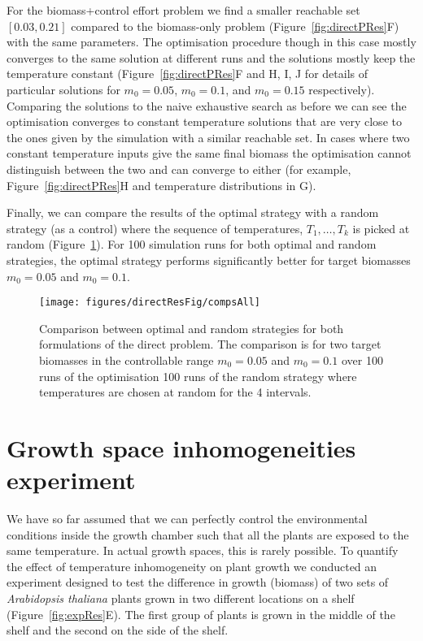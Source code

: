 For the biomass+control effort problem we find a smaller reachable set
$[0.03, 0.21]$ compared to the biomass-only problem
(Figure~\ref{fig:directPRes}F) with the same parameters. The optimisation
procedure though in this case mostly converges to the same solution at different
runs and the solutions mostly keep the temperature constant
(Figure~\ref{fig:directPRes}F and H, I, J for details of particular solutions
for $m_0=0.05$, $m_0=0.1$, and $m_0=0.15$ respectively). Comparing the solutions
to the naive exhaustive search as before we can see the optimisation converges
to constant temperature solutions that are very close to the ones given by the
simulation with a similar reachable set. In cases where two constant temperature
inputs give the same final biomass the optimisation cannot distinguish between
the two and can converge to either (for example, Figure~\ref{fig:directPRes}H
and temperature distributions in G).

Finally, we can compare the results of the optimal strategy with a random
strategy (as a control) where the sequence of temperatures, $T_1, \dots, T_k$ is
picked at random (Figure~\ref{fig:compsAllDir}). For 100 simulation runs for
both optimal and random strategies, the optimal strategy performs significantly
better for target biomasses $m_0=0.05$ and $m_0=0.1$.

\begin{figure}[tb]
\centering
\texttt{[image: figures/directResFig/compsAll]}
\caption{
  Comparison between optimal and random strategies for both formulations of the
  direct problem. The comparison is for two target biomasses in the controllable
  range $m_0=0.05$ and $m_0=0.1$ over 100 runs of the optimisation 100 runs of
  the random strategy where temperatures are chosen at random for the 4
  intervals.
}
\label{fig:compsAllDir}
\end{figure}


\section{Growth space inhomogeneities experiment}
\label{sec:exp}
We have so far assumed that we can perfectly control the environmental
conditions inside the growth chamber such that all the plants are exposed to the
same temperature. In actual growth spaces, this is rarely possible. To quantify
the effect of temperature inhomogeneity on plant growth we conducted an
experiment designed to test the difference in growth (biomass) of two sets of
\textit{Arabidopsis thaliana} plants grown in two different locations on a shelf
(Figure~\ref{fig:expRes}E). The first group of plants is grown in the middle of
the shelf and the second on the side of the shelf.

